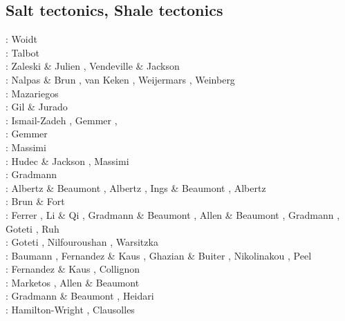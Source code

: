 \subsection{Salt tectonics, Shale tectonics}

\begin{scriptsize}
\nineteenseventyeight: Woidt \cite{woid78}\\
\nineteenninetyone: Talbot \etal \cite{tars91}\\
\nineteenninetytwo: Zaleski \& Julien \cite{zaju92},  Vendeville \& Jackson \cite{veja92}\\
\nineteenninetythree: Nalpas \& Brun \cite{nabr93}, van Keken \etal \cite{vasv93}, 
                      Weijermars \etal \cite{wejv93}, Weinberg \cite{wein93}\\
\nineteenninetysix: Mazariegos \etal \cite{maar96}\\
\nineteenninetyeight: Gil \& Jurado \cite{giju98}\\
\twothousandfour: Ismail-Zadeh \etal \cite{istt04}, Gemmer \etal \cite{geim04}, \cite{mcmg04}\\
\twothousandfive: Gemmer \etal \cite{gebi05}\\
\twothousandsix: Massimi \etal \cite{maqs06}\\
\twothousandseven: Hudec \& Jackson \cite{huja07}, Massimi \etal \cite{maqs07}\\
\twothousandnine: Gradmann  \etal \cite{grba09}\\
\twothousandten: Albertz \& Beaumont \cite{albe10}, Albertz \etal \cite{albi10}, 
                 Ings \& Beaumont \cite{inbe10,inbe10b}, Albertz \etal \cite{albs10}\\
\twothousandeleven: Brun \& Fort \cite{brfo11}\\
\twothousandtwelve: Ferrer \etal \cite{fejr12}, Li \& Qi \cite{liqi12}, Gradmann \& Beaumont \cite{grbe12},
                    Allen \& Beaumont \cite{albe12}, Gradmann \etal \cite{grbi12},
                    Goteti \etal \cite{goib12}, Ruh \etal \cite{rukb12}\\
\twothousandthirteen: Goteti \etal \cite{gobi13}, Nilfouroushan \etal \cite{nipc13}, 
                      Warsitzka \etal \cite{wakk13}\\
\twothousandfourteen: Baumann \etal \cite{bakp14}, Fernandez \& Kaus \cite{feka14a,feka14b},
                      Ghazian \& Buiter \cite{ghbu14}, Nikolinakou \etal \cite{nifh14}, Peel \cite{peel14}\\
\twothousandfifteen: Fernandez \& Kaus \cite{feka15}, Collignon \etal \cite{cofk15}\\
\twothousandsixteen: Marketos \etal \cite{masg16}, Allen \& Beaumont \cite{albe16}\\
\twothousandseventeen: Gradmann \& Beaumont \cite{grbe17}, Heidari \etal \cite{henf17}\\
\twothousandnineteen: Hamilton-Wright \etal \cite{hadv19}, Clausolles \etal \cite{clcc19}
\end{scriptsize}

